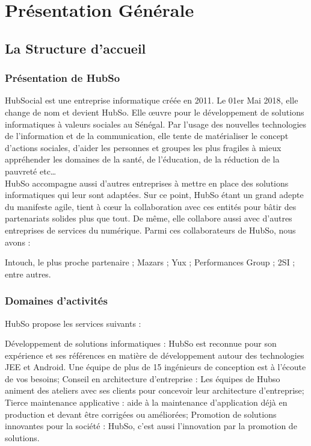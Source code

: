 \chapter{Présentation Générale}
\minitoc
\clearpage
%

\section{La Structure d'accueil}

\subsection{Présentation de HubSo}
HubSocial est une entreprise informatique créée en 2011. Le 01er Mai 2018, elle change de nom et devient HubSo. Elle œuvre pour le développement de solutions informatiques à valeurs sociales au Sénégal. Par l’usage des nouvelles technologies de l'information et de la communication, elle tente de matérialiser le concept d’actions sociales, d’aider les personnes et groupes les plus fragiles à mieux appréhender les domaines de la santé, de l’éducation, de la réduction de la pauvreté etc…\\
HubSo accompagne aussi d'autres entreprises à mettre en place des solutions informatiques qui leur sont adaptées. Sur ce point, HubSo étant un grand adepte du manifeste agile, tient à cœur la collaboration avec ces entités pour bâtir des partenariats solides plus que tout. De même, elle collabore aussi avec d'autres entreprises de services du numérique. Parmi ces collaborateurs de HubSo, nous avons : 
\begin{itemize}
	\itemtirait Intouch, le plus proche partenaire ;
	\itemtirait Mazars ;
	\itemtirait Yux ;
	\itemtirait Performances Group ;
	\itemtirait 2SI ;
	\itemtirait entre autres.
\end{itemize}

\subsection{Domaines d'activités}
HubSo propose les services suivants : 
\begin{itemize}
	\itemcheck Développement de solutions informatiques : HubSo est reconnue pour son expérience et ses références en matière de développement autour des technologies JEE et Android. Une équipe de plus de 15 ingénieurs de conception est à l'écoute de vos besoins; 
	\itemcheck Conseil en architecture d'entreprise : Les équipes de Hubso animent des ateliers avec ses clients  pour concevoir leur architecture d'entreprise; 
	\itemcheck Tierce maintenance applicative : aide à la maintenance d'application déjà en production et devant être corrigées ou améliorées; 
	\itemcheck Promotion de solutions innovantes pour la société : HubSo, c'est aussi l'innovation par la promotion de solutions.
\end{itemize}



